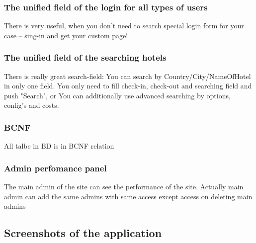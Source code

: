 \documentclass{sig-alternate-05-2015}
\begin{document}
\subsubsection{The unified field of the login for all types of users}
There is very useful, when you don't need to search special login form for your case -- sing-in and get your custom page!

\subsubsection{The unified field of the searching hotels}
There is really great search-field: You can search by Country/City/NameOfHotel in only one field. You only need to fill check-in, check-out and searching field and push "Search", or You can additionally use advanced searching by options, config's and costs. 

\subsubsection{BCNF}
All talbe in BD is in BCNF relation
\subsubsection{Admin perfomance panel}
The main admin of the site can see the performance of the site. Actually main admin can add the same admins with same access except access on deleting main admins

\subsection{Screenshots of the application}
\end{document}
